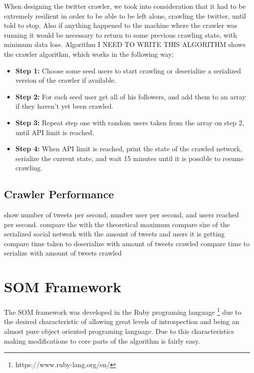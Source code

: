 When designing the twitter crawler, we took into consideration that it had to be extremely resilient in order to be able to be left alone, crawling the twitter, until told to stop. Also if anything happened to the machine where the crawler was running it would be necessary to return to some previous crawling state, with minimum data loss. Algorithm {\color{red} I NEED TO WRITE THIS ALGORITHM } shows the crawler algorithm, which works in the following way:

\begin{itemize}
  \item \textbf{Step 1:} Choose some seed users to start crawling or deserialize a serialized version of the crawler if available.
  \item \textbf{Step 2:} For each seed user get all of his followers, and add them to an array if they haven't yet been crawled.
  \item \textbf{Step 3:} Repeat step one with random users taken from the array on step 2, until API limit is reached.
  \item \textbf{Step 4:} When API limit is reached, print the state of the crawled network, serialize the current state, and wait 15 minutes until it is possible to resume crawling. 
\end{itemize}

\subsection{Crawler Performance}
\label{sub:crawler_performance}
{\color{red} show number of tweets per second, number user per second, and users reached per second. }
{\color{red} compare the with the theoretical maximum }
{\color{red} compare size of the serialized social network with the amount of tweets and users it is getting  }
{\color{red} compare time taken to deserialize with amount of tweets crawled }
{\color{red} compare time to serialize with amount of tweets crawled }
 


\section{SOM Framework}
\label{sec:som_framework}
The \ac{SOM} framework was developed in the Ruby programing language \footnote{https://www.ruby-lang.org/en/} due to the desired characteristic of allowing great levels of introspection and being an almost pure object oriented programing language. Due to this characteristics making modifications to core parts of the algorithm is fairly easy.

